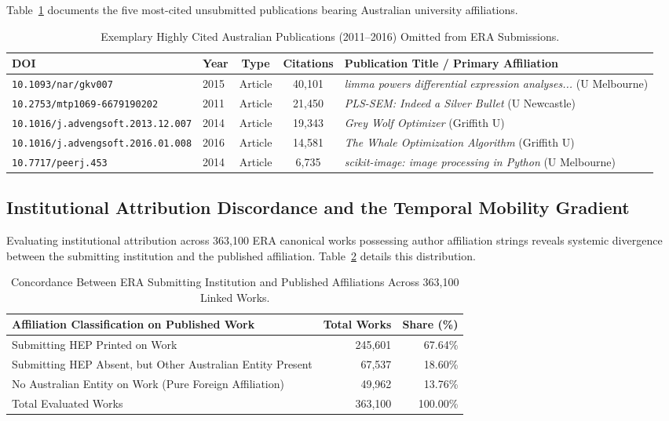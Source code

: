 Table~\ref{tab:high_cited_examples} documents the five most-cited unsubmitted publications bearing Australian university affiliations.

\begin{table}[htbp]
\centering
\caption{Exemplary Highly Cited Australian Publications (2011--2016) Omitted from ERA Submissions.}
\label{tab:high_cited_examples}
\begin{tabular*}{\textwidth}{@{\extracolsep{\fill}}llccl@{}}
\toprule
DOI & Year & Type & Citations & Publication Title / Primary Affiliation \\
\midrule
\texttt{10.1093/nar/gkv007} & 2015 & Article & 40,101 & \textit{limma powers differential expression analyses...} (U Melbourne) \\
\texttt{10.2753/mtp1069-6679190202} & 2011 & Article & 21,450 & \textit{PLS-SEM: Indeed a Silver Bullet} (U Newcastle) \\
\texttt{10.1016/j.advengsoft.2013.12.007} & 2014 & Article & 19,343 & \textit{Grey Wolf Optimizer} (Griffith U) \\
\texttt{10.1016/j.advengsoft.2016.01.008} & 2016 & Article & 14,581 & \textit{The Whale Optimization Algorithm} (Griffith U) \\
\texttt{10.7717/peerj.453} & 2014 & Article & 6,735 & \textit{scikit-image: image processing in Python} (U Melbourne) \\
\bottomrule
\end{tabular*}
\end{table}

\subsection{Institutional Attribution Discordance and the Temporal Mobility Gradient}

Evaluating institutional attribution across 363,100 ERA canonical works possessing author affiliation strings reveals systemic divergence between the submitting institution and the published affiliation. Table~\ref{tab:affiliation_concordance} details this distribution.

\begin{table}[htbp]
\centering
\caption{Concordance Between ERA Submitting Institution and Published Affiliations Across 363,100 Linked Works.}
\label{tab:affiliation_concordance}
\begin{tabular*}{\textwidth}{@{\extracolsep{\fill}}lrr@{}}
\toprule
Affiliation Classification on Published Work & Total Works & Share (\%) \\
\midrule
Submitting HEP Printed on Work                      & 245,601 & 67.64\% \\
Submitting HEP Absent, but Other Australian Entity Present &  67,537 & 18.60\% \\
No Australian Entity on Work (Pure Foreign Affiliation) &  49,962 & 13.76\% \\
\midrule
Total Evaluated Works                              & 363,100 & 100.00\% \\
\bottomrule
\end{tabular*}
\end{table}

